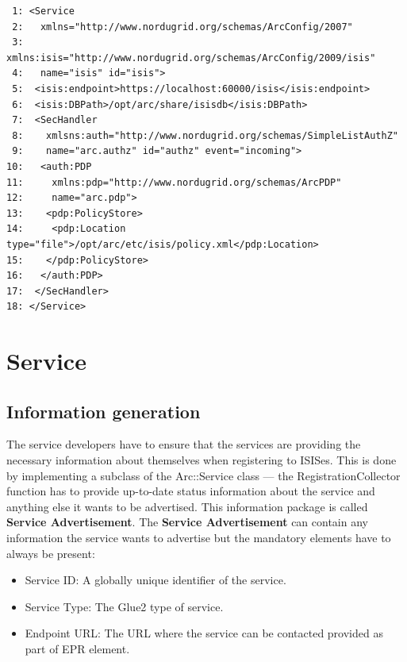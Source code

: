 \documentclass{book}
\begin{document}
\begin{verbatim}
 1: <Service 
 2:   xmlns="http://www.nordugrid.org/schemas/ArcConfig/2007"
 3:   xmlns:isis="http://www.nordugrid.org/schemas/ArcConfig/2009/isis"
 4:   name="isis" id="isis">
 5:  <isis:endpoint>https://localhost:60000/isis</isis:endpoint>
 6:  <isis:DBPath>/opt/arc/share/isisdb</isis:DBPath>
 7:  <SecHandler
 8:    xmlsns:auth="http://www.nordugrid.org/schemas/SimpleListAuthZ"
 9:    name="arc.authz" id="authz" event="incoming">
10:   <auth:PDP
11:     xmlns:pdp="http://www.nordugrid.org/schemas/ArcPDP"
12:     name="arc.pdp">
13:    <pdp:PolicyStore>
14:     <pdp:Location type="file">/opt/arc/etc/isis/policy.xml</pdp:Location>
15:    </pdp:PolicyStore>
16:   </auth:PDP>
17:  </SecHandler>
18: </Service>

\end{verbatim}





\chapter{Service}
\label{cha:service}

\section{Information generation}
\label{sec:service_information_generation}

The service developers have to ensure that the services are providing the necessary information about 
themselves when registering to ISISes. This is done by implementing a subclass of the Arc::Service class ---
the RegistrationCollector function has to provide up-to-date status information about the service and anything 
else it wants to be advertised. This information package is called \textbf{Service Advertisement}.
\label{service_advertisement}
The \textbf{Service Advertisement} can contain any information the service wants to advertise but the mandatory 
elements have to always be present:
\begin{itemize}
  \item Service ID: A globally unique identifier of the service.
  \item Service Type: The Glue2 type of service.
  \item Endpoint URL: The URL where the service can be contacted provided as part of EPR element.
\end{itemize}
\end{document}
